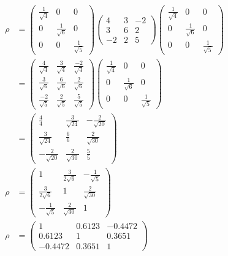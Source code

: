 \begin{align*}
\rho &= \begin{pmatrix}
\frac{1}{\sqrt{4}} & 0 & 0 \\
0 &\frac{1}{\sqrt{6}} & 0 \\
 0 & 0 & \frac{1}{\sqrt{5}}
\end{pmatrix}
\begin{pmatrix}
4&3&-2\\
3&6&2\\
-2&2&5
\end{pmatrix}
\begin{pmatrix}
\frac{1}{\sqrt{4}} & 0 & 0 \\
0 &\frac{1}{\sqrt{6}} & 0 \\
 0 & 0 & \frac{1}{\sqrt{5}}
\end{pmatrix}\\
&= \begin{pmatrix}
\frac{4}{\sqrt{4}} & \frac{3}{\sqrt{4}} & \frac{-2}{\sqrt{4}} \\
\frac{3}{\sqrt{6}} & \frac{6}{\sqrt{6}} & \frac{2}{\sqrt{6}} \\
\frac{-2}{\sqrt{5}} & \frac{2}{\sqrt{5}} & \frac{5}{\sqrt{5}}
\end{pmatrix}
\begin{pmatrix}
\frac{1}{\sqrt{4}} & 0 & 0 \\
0 &\frac{1}{\sqrt{6}} & 0 \\
 0 & 0 & \frac{1}{\sqrt{5}}
\end{pmatrix}\\
&= \begin{pmatrix}
\frac{4}{4} & \frac{3}{\sqrt{24}} & -\frac{2}{\sqrt{20}} \\
\frac{3}{\sqrt{24}} & \frac{6}{6} & \frac{2}{\sqrt{30}} \\
-\frac{2}{\sqrt{20}} & \frac{2}{\sqrt{30}} & \frac{5}{5}
\end{pmatrix}\\
\rho &= \begin{pmatrix}
1 & \frac{3}{2\sqrt{6}} & -\frac{1}{\sqrt{5}} \\
\frac{3}{2\sqrt{6}} & 1 & \frac{2}{\sqrt{30}} \\
-\frac{1}{\sqrt{5}} & \frac{2}{\sqrt{30}} & 1
\end{pmatrix}\\
\rho &= 
\begin{pmatrix}
1 & 0.6123 & -0.4472 \\
0.6123 & 1 & 0.3651 \\
-0.4472 &  0.3651 & 1
\end{pmatrix}
\end{align*}
